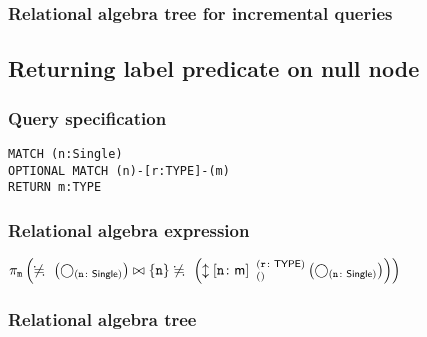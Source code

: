 \subsubsection*{Relational algebra tree for incremental queries}


\subsection{Returning label predicate on null node}

\subsubsection*{Query specification}

\begin{lstlisting}
MATCH (n:Single)
OPTIONAL MATCH (n)-[r:TYPE]-(m)
RETURN m:TYPE
\end{lstlisting}

\subsubsection*{Relational algebra expression}

$\projection{\var{m}} \left(\alldifferent{} \left(\getvertices{n}{Single}\right) \join \{\var{n}\} \alldifferent{} \left(\expandboth{n}{m}{}{r}{TYPE} \left(\getvertices{n}{Single}\right)\right)\right)$

\subsubsection*{Relational algebra tree}

